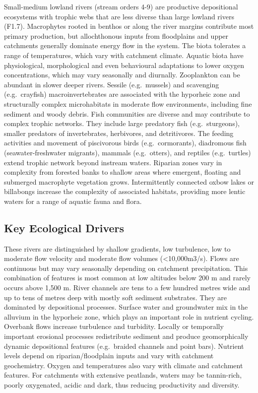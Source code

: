 \documentclass[
  letterpaper,
  DIV=11,
  numbers=noendperiod]{scrartcl}
\begin{document}
Small-medium lowland rivers (stream orders 4-9) are productive
depositional ecosystems with trophic webs that are less diverse than
large lowland rivers (F1.7). Macrophytes rooted in benthos or along the
river margins contribute most primary production, but allochthonous
inputs from floodplains and upper catchments generally dominate energy
flow in the system. The biota tolerates a range of temperatures, which
vary with catchment climate. Aquatic biota have physiological,
morphological and even behavioural adaptations to lower oxygen
concentrations, which may vary seasonally and diurnally. Zooplankton can
be abundant in slower deeper rivers. Sessile (e.g.~mussels) and
scavenging (e.g.~crayfish) macroinvertebrates are associated with the
hyporheic zone and structurally complex microhabitats in moderate flow
environments, including fine sediment and woody debris. Fish communities
are diverse and may contribute to complex trophic networks. They include
large predatory fish (e.g.~sturgeons), smaller predators of
invertebrates, herbivores, and detritivores. The feeding activities and
movement of piscivorous birds (e.g.~cormorants), diadromous fish
(seawater-freshwater migrants), mammals (e.g.~otters), and reptiles
(e.g.~turtles) extend trophic network beyond instream waters. Riparian
zones vary in complexity from forested banks to shallow areas where
emergent, floating and submerged macrophyte vegetation grows.
Intermittently connected oxbow lakes or billabongs increase the
complexity of associated habitats, providing more lentic waters for a
range of aquatic fauna and flora.

\subsection{Key Ecological Drivers}\label{key-ecological-drivers-1}

These rivers are distinguished by shallow gradients, low turbulence, low
to moderate flow velocity and moderate flow volumes
(\textless10,000m3/s). Flows are continuous but may vary seasonally
depending on catchment precipitation. This combination of features is
most common at low altitudes below 200 m and rarely occurs above 1,500
m. River channels are tens to a few hundred metres wide and up to tens
of metres deep with mostly soft sediment substrates. They are dominated
by depositional processes. Surface water and groundwater mix in the
alluvium in the hyporheic zone, which plays an important role in
nutrient cycling. Overbank flows increase turbulence and turbidity.
Locally or temporally important erosional processes redistribute
sediment and produce geomorphically dynamic depositional features
(e.g.~braided channels and point bars). Nutrient levels depend on
riparian/floodplain inputs and vary with catchment geochemistry. Oxygen
and temperatures also vary with climate and catchment features. For
catchments with extensive peatlands, waters may be tannin-rich, poorly
oxygenated, acidic and dark, thus reducing productivity and diversity.
\end{document}

